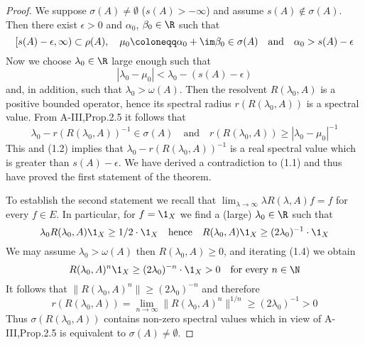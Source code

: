 \begin{proof}
	We suppose $\sigma(A) \neq \emptyset$ (\ie $s(A) > -\infty$) and assume $s(A) \notin \sigma(A)$.
	Then there exist $\epsilon > 0$ and $\alpha_{0}$, $\beta_{0} \in \R$ such that
	\begin{equation}\label{eq:b3-1.1}
		[s(A)-\epsilon,\infty) \subset \rho(A), \quad \mu_{0} \coloneqq \alpha_{0} + \im\beta_{0} \in \sigma(A) \quad \text{and} \quad \alpha_{0} > s(A)-\epsilon
	\end{equation}
	Now we choose $\lambda_{0} \in \R$ large enough such that
	\begin{equation}\label{eq:b3-1.2}
		|\lambda_{0} - \mu_{0}| < \lambda_{0} - (s(A) - \epsilon)
	\end{equation}
	and, in addition, such that $\lambda_{0} > \omega(A)$.
	Then the resolvent $R(\lambda_{0},A)$ is a positive bounded operator, hence its spectral radius $r(R(\lambda_{0},A))$ is a spectral value.
	From A-III,Prop.2.5 it follows that
	\begin{equation}\label{eq:b3-1.3}
		\lambda_{0} - r(R(\lambda_{0},A))^{-1} \in \sigma(A) \quad \text{and} \quad r(R(\lambda_{0},A)) \geq |\lambda_{0} - \mu_{0}|^{-1}
	\end{equation}
	This and (1.2) implies that $\lambda_{0} - r(R(\lambda_{0},A))^{-1}$ is a real spectral value which is greater than $s(A) - \epsilon$.
	We have derived a contradiction to (1.1) and thus have proved the first statement of the theorem.
	
	To establish the second statement we recall that $\lim_{\lambda \to \infty}\lambda R(\lambda,A)f = f$ for every $f \in E$.
	In particular, for $f = \1_{X}$ we find a (large) $\lambda_{0} \in \R$ such that
	\begin{equation}\label{eq:b3-1.4}
		\lambda_{0}R(\lambda_{0},A)\1_{X} \geq 1/2\cdot\1_{X} \quad \text{hence} \quad R(\lambda_{0},A)\1_{X} \geq (2\lambda_{0})^{-1}\cdot\1_{X}
	\end{equation}
	We may assume $\lambda_{0} > \omega(A)$ then $R(\lambda_{0},A) \geq 0$, and iterating (1.4) we obtain
	\begin{equation}\label{eq:b3-1.5}
		R(\lambda_{0},A)^{n}\1_{X} \geq (2\lambda_{0})^{-n}\cdot\1_{X} > 0 \quad \text{for every } n \in \N
	\end{equation}
	It follows that $\|R(\lambda_{0},A)^{n}\| \geq (2\lambda_{0})^{-n}$ and therefore
	\begin{equation}\label{eq:b3-1.6}
		r(R(\lambda_{0},A)) = \lim_{n \to \infty}\|R(\lambda_{0},A)^{n}\|^{1/n} \geq (2\lambda_{0})^{-1} > 0
	\end{equation}
	Thus $\sigma(R(\lambda_{0},A))$ contains non-zero spectral values which in view of A-III,Prop.2.5 is equivalent to $\sigma(A) \neq \emptyset$.
\end{proof}
